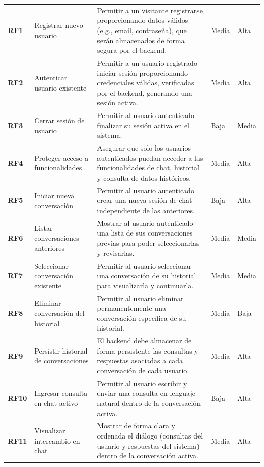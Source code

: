 \begin{longtable}{@{}l >{\raggedright\arraybackslash}p{4.5cm} >{\raggedright\arraybackslash}p{6.5cm} l l@{}}
	\textbf{RF1} & Registrar nuevo usuario & Permitir a un visitante registrarse proporcionando datos válidos (e.g., email, contraseña), que serán almacenados de forma segura por el backend. & Media & Alta \\ 
	\textbf{RF2} & Autenticar usuario existente & Permitir a un usuario registrado iniciar sesión proporcionando credenciales válidas, verificadas por el backend, generando una sesión activa. & Media & Alta \\ 
	\textbf{RF3} & Cerrar sesión de usuario & Permitir al usuario autenticado finalizar su sesión activa en el sistema. & Baja & Media \\ 
	\textbf{RF4} & Proteger acceso a funcionalidades & Asegurar que solo los usuarios autenticados puedan acceder a las funcionalidades de chat, historial y consulta de datos históricos. & Media & Alta \\ 
	\textbf{RF5} & Iniciar nueva conversación & Permitir al usuario autenticado crear una nueva sesión de chat independiente de las anteriores. & Baja & Alta \\ %
	\textbf{RF6} & Listar conversaciones anteriores & Mostrar al usuario autenticado una lista de sus conversaciones previas para poder seleccionarlas y revisarlas. & Media & Media \\ %
	\textbf{RF7} & Seleccionar conversación existente & Permitir al usuario seleccionar una conversación de su historial para visualizarla y continuarla. & Media & Media \\ %
	\textbf{RF8} & Eliminar conversación del historial & Permitir al usuario eliminar permanentemente una conversación específica de su historial. & Media & Baja \\ %
	\textbf{RF9} & Persistir historial de conversaciones & El backend debe almacenar de forma persistente las consultas y respuestas asociadas a cada conversación de cada usuario. & Media & Alta \\ %
	\textbf{RF10} & Ingresar consulta en chat activo & Permitir al usuario escribir y enviar una consulta en lenguaje natural dentro de la conversación activa. & Baja & Alta \\ 
	\textbf{RF11} & Visualizar intercambio en chat & Mostrar de forma clara y ordenada el diálogo (consultas del usuario y respuestas del sistema) dentro de la conversación activa. & Media & Alta \\ 

\end{longtable}
